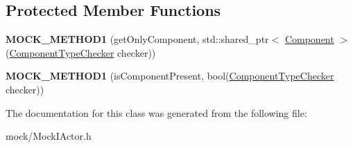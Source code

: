 \subsection*{Protected Member Functions}
\begin{DoxyCompactItemize}
\item 
{\bfseries M\+O\+C\+K\+\_\+\+M\+E\+T\+H\+O\+D1} (get\+Only\+Component, std\+::shared\+\_\+ptr$<$ \hyperlink{classComponent}{Component} $>$(\hyperlink{classComponentTypeChecker}{Component\+Type\+Checker} checker))\hypertarget{classMockIActor_a190cfbf06b75f8c70acfa5acf30e8c2d}{}\label{classMockIActor_a190cfbf06b75f8c70acfa5acf30e8c2d}

\item 
{\bfseries M\+O\+C\+K\+\_\+\+M\+E\+T\+H\+O\+D1} (is\+Component\+Present, bool(\hyperlink{classComponentTypeChecker}{Component\+Type\+Checker} checker))\hypertarget{classMockIActor_a34ce3d63d16546d0a8acef4745cd214b}{}\label{classMockIActor_a34ce3d63d16546d0a8acef4745cd214b}

\end{DoxyCompactItemize}


The documentation for this class was generated from the following file\+:\begin{DoxyCompactItemize}
\item 
mock/Mock\+I\+Actor.\+h\end{DoxyCompactItemize}
